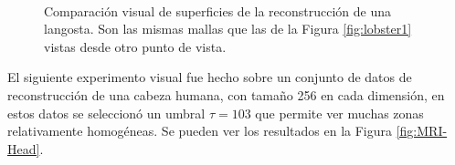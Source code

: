 \begin{figure}[htp]
\begin{center}
     \\
  \end{center}
  \caption[Comparación visual de superficies de la reconstrucción de una langosta. Son las mismas mallas que las de la Figura \ref{fig:lobster1} vistas desde otro punto de vista]{Comparación visual de superficies de la reconstrucción de una langosta. Son las mismas mallas que las de la Figura \ref{fig:lobster1} vistas desde otro punto de vista.}
  \label{fig:lobster2}
\end{figure}

El siguiente experimento visual fue hecho sobre un conjunto de datos de reconstrucción de una cabeza humana, con tamaño 256 en cada dimensión, en estos datos se seleccionó un umbral $\tau = 103$ que permite ver muchas zonas relativamente homogéneas. Se pueden ver los resultados en la Figura \ref{fig:MRI-Head}.

